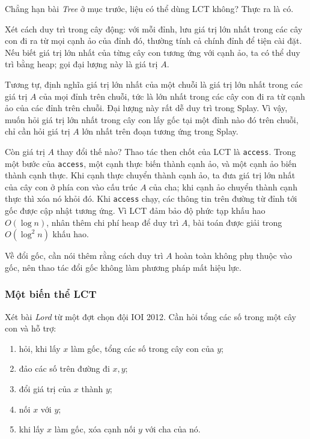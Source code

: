 \documentclass[11pt]{article}
\begin{document}
Chẳng hạn bài \emph{Tree} ở mục trước, liệu có thể dùng LCT không? Thực ra là
có.

Xét cách duy trì trong cây động: với mỗi đỉnh, lưu giá trị lớn nhất trong các
cây con đi ra từ mọi cạnh ảo của đỉnh đó, thường tính cả chính đỉnh để tiện cài
đặt. Nếu biết giá trị lớn nhất của từng cây con tương ứng với cạnh ảo, ta có thể
duy trì bằng heap; gọi đại lượng này là giá trị \(A\).

Tương tự, định nghĩa giá trị lớn nhất của một chuỗi là giá trị lớn nhất trong
các giá trị \(A\) của mọi đỉnh trên chuỗi, tức là lớn nhất trong các cây con đi
ra từ cạnh ảo của các đỉnh trên chuỗi. Đại lượng này rất dễ duy trì trong Splay.
Vì vậy, muốn hỏi giá trị lớn nhất trong cây con lấy gốc tại một đỉnh nào đó trên
chuỗi, chỉ cần hỏi giá trị \(A\) lớn nhất trên đoạn tương ứng trong Splay.

Còn giá trị \(A\) thay đổi thế nào? Thao tác then chốt của LCT là
\texttt{access}. Trong một bước của \texttt{access}, một cạnh thực biến thành
cạnh ảo, và một cạnh ảo biến thành cạnh thực. Khi cạnh thực chuyển thành cạnh
ảo, ta đưa giá trị lớn nhất của cây con ở phía con vào cấu trúc \(A\) của cha;
khi cạnh ảo chuyển thành cạnh thực thì xóa nó khỏi đó. Khi \texttt{access} chạy,
các thông tin trên đường từ đỉnh tới gốc được cập nhật tương ứng. Vì LCT đảm bảo
độ phức tạp khấu hao \(O(\log n)\), nhân thêm chi phí heap để duy trì \(A\), bài
toán được giải trong \(O(\log^2 n)\) khấu hao.

Về đổi gốc, cần nói thêm rằng cách duy trì \(A\) hoàn toàn không phụ thuộc vào
gốc, nên thao tác đổi gốc không làm phương pháp mất hiệu lực.

\subsubsection{Một biến thể LCT}

Xét bài \emph{Lord} từ một đợt chọn đội IOI 2012. Cần hỏi tổng các số trong một
cây con và hỗ trợ:
\begin{enumerate}
  \item hỏi, khi lấy \(x\) làm gốc, tổng các số trong cây con của \(y\);
  \item đảo các số trên đường đi \(x,y\);
  \item đổi giá trị của \(x\) thành \(y\);
  \item nối \(x\) với \(y\);
  \item khi lấy \(x\) làm gốc, xóa cạnh nối \(y\) với cha của nó.
\end{enumerate}
\end{document}
